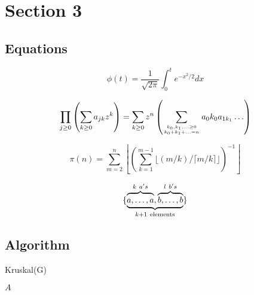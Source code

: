 \documentclass[a4paper,12pt,hidelinks]{article}
\begin{document}
	\pagebreak

\section{Section 3}
	\subsection{Equations}
	\begin{equation}
		\phi(t)=\frac{1}{\sqrt{2\pi}}
		\int^t_0 e^{-x^2/2} dx 
	\end{equation}

	\begin{equation}
		\prod_{j\geq 0}
		\left(\sum_{k\geq 0}a_{jk} z^k\right) 
		= \sum_{k\geq 0} z^n
		\left( \sum_{{k_0,k_1,\ldots\geq 0}
		\atop{k_0+k_1+\ldots=n}    }
		a{_0k_0}a_{1k_1}\ldots  \right) 
	\end{equation}

	\begin{equation}
		\pi(n) = \sum_{m=2}^{n}
		\left\lfloor \left(\sum_{k=1}^{m-1}
		\lfloor(m/k)/\lceil m/k\rceil 
		\rfloor \right)^{-1}
		\right\rfloor
	\end{equation}

	\begin{equation}
		\{\underbrace{
			\overbrace{\mathstrut a,\ldots,a}^{k\ a's},
			\overbrace{\mathstrut b,\ldots,b}^{l\ b's}}
			_{k+1\ \mathrm{elements}}                   \}
	\end{equation}

	\subsection{Algorithm}

	\begin{algorithm}[H]
		\caption{Kruskal(G)}
		\begin{algorithmic}[1]
			\EndFor
				\EndIf
			\EndFor
			\Return $A$
		\end{algorithmic}
	\end{algorithm}



\pagebreak 

\printbibliography
\end{document}
